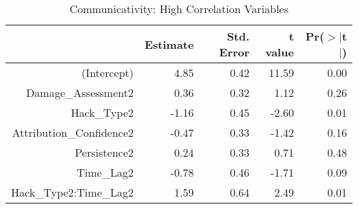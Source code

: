 \begin{table}[ht]
\centering
\caption{Communicativity: High Correlation Variables} 
\begin{tabular}{rrrrr}
  \hline
 & Estimate & Std. Error & t value & Pr($>$$|$t$|$) \\ 
  \hline
(Intercept) & 4.85 & 0.42 & 11.59 & 0.00 \\ 
  Damage\_Assessment2 & 0.36 & 0.32 & 1.12 & 0.26 \\ 
  Hack\_Type2 & -1.16 & 0.45 & -2.60 & 0.01 \\ 
  Attribution\_Confidence2 & -0.47 & 0.33 & -1.42 & 0.16 \\ 
  Persistence2 & 0.24 & 0.33 & 0.71 & 0.48 \\ 
  Time\_Lag2 & -0.78 & 0.46 & -1.71 & 0.09 \\ 
  Hack\_Type2:Time\_Lag2 & 1.59 & 0.64 & 2.49 & 0.01 \\ 
   \hline
\end{tabular}
\end{table}
